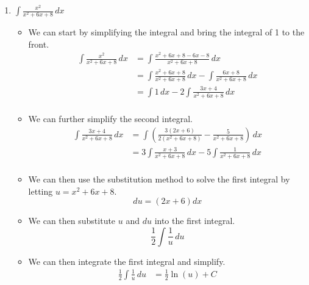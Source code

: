 \documentclass[12pt]{article}
\begin{document}
\begin{enumerate}[leftmargin=\labelsep]
\begin{enumerate}
        \newpage
        \item $\displaystyle{\int \frac{x^2}{x^2+6x+8} \, dx}$
        \begin{itemize}[label={}]
            \item We can start by simplifying the integral and bring the integral of 1 to the front.
            \begin{equation*}
                \begin{split}
                    \int \frac{x^2}{x^2+6x+8} \, dx &= \int \frac{x^2+6x+8-6x-8}{x^2+6x+8} \, dx \\
                    &= \int \frac{x^2+6x+8}{x^2+6x+8} \, dx - \int \frac{6x+8}{x^2+6x+8} \, dx \\
                    &= \int 1 \, dx - 2 \int \frac{3x+4}{x^2+6x+8} \, dx \\
                \end{split}
            \end{equation*}
            \item We can further simplify the second integral.
            \begin{equation*}
                \begin{split}
                    \int \frac{3x+4}{x^2+6x+8} \, dx &= \int \left( \frac{3(2x+6)}{2(x^2+6x+8)} - \frac{5}{x^2+6x+8} \right) \, dx \\
                    &= 3 \int \frac{x+3}{x^2+6x+8} \, dx - 5 \int \frac{1}{x^2+6x+8} \, dx \\
                \end{split}
            \end{equation*}
            \item We can then use the substitution method to solve the first integral by letting $u=x^2+6x+8$.
            \begin{equation*}
                du = (2x+6) dx
            \end{equation*}
            \item We can then substitute $u$ and $du$ into the first integral.
            \begin{equation*}
                \frac{1}{2} \int \frac{1}{u} \, du
            \end{equation*}
            \item We can then integrate the first integral and simplify.
            \begin{equation*}
                \begin{aligned}
                    \frac{1}{2} \int \frac{1}{u} \, du &= \frac{1}{2} \ln(u) + C \\

\end{aligned}
\end{equation*}
\end{itemize}
\end{enumerate}
\end{enumerate}
\end{document}
